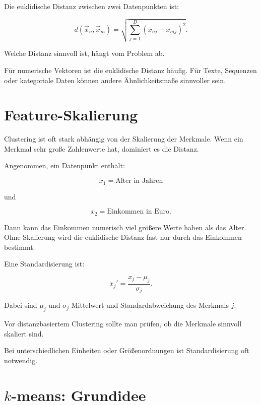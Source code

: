 \begin{definitionbox}
Die euklidische Distanz zwischen zwei Datenpunkten ist:

\[
    d(\vec{x}_n,\vec{x}_m)
    =
    \sqrt{
        \sum_{j=1}^{D}
        (x_{nj}-x_{mj})^2
    }.
\]
\end{definitionbox}

\begin{notebox}
Welche Distanz sinnvoll ist, hängt vom Problem ab.

Für numerische Vektoren ist die euklidische Distanz häufig.
Für Texte, Sequenzen oder kategoriale Daten können andere Ähnlichkeitsmaße sinnvoller sein.
\end{notebox}

\section{Feature-Skalierung}

Clustering ist oft stark abhängig von der Skalierung der Merkmale.
Wenn ein Merkmal sehr große Zahlenwerte hat, dominiert es die Distanz.

\begin{examplebox}
Angenommen, ein Datenpunkt enthält:

\[
    x_1 = \text{Alter in Jahren}
\]

und

\[
    x_2 = \text{Einkommen in Euro}.
\]

Dann kann das Einkommen numerisch viel größere Werte haben als das Alter.
Ohne Skalierung wird die euklidische Distanz fast nur durch das Einkommen bestimmt.
\end{examplebox}

Eine Standardisierung ist:

\[
    x_j'
    =
    \frac{x_j-\mu_j}{\sigma_j}.
\]

Dabei sind \(\mu_j\) und \(\sigma_j\) Mittelwert und Standardabweichung des Merkmals \(j\).

\begin{examtipbox}
Vor distanzbasiertem Clustering sollte man prüfen, ob die Merkmale sinnvoll skaliert sind.

Bei unterschiedlichen Einheiten oder Größenordnungen ist Standardisierung oft notwendig.
\end{examtipbox}

\section{\(k\)-means: Grundidee}

